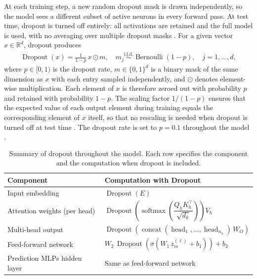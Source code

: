 At each training step, a new random dropout mask is drawn independently,
so the model sees a different subset of active neurons in every forward pass.
At test time, dropout is turned off entirely: all activations are retained
and the full model is used, with no averaging over multiple dropout masks
\citep{Dropout}. For a given vector $x \in \mathbb{R}^{d}$, dropout produces
\begin{align*}
    \operatorname{Dropout}(x) = \frac{1}{1 - p}\, x \odot m, \quad
    m_j \overset{\mathrm{i.i.d.}}{\sim} \operatorname{Bernoulli}(1 - p),
    \quad j = 1, \dots, d,
\end{align*}
where $p \in [0, 1)$ is the dropout rate, $m \in \{0, 1\}^{d}$ is a binary
mask of the same dimension as $x$ with each entry sampled independently,
and $\odot$ denotes element-wise multiplication. Each element of $x$ is
therefore zeroed out with probability $p$ and retained with probability
$1 - p$. The scaling factor $1/(1-p)$ ensures that the expected value of
each output element during training equals the corresponding element of $x$
itself, so that no rescaling is needed when dropout is turned off at test
time \citep{Srivastava2014dropout, PyTorchDropout}. The dropout rate is set
to $p = 0.1$ throughout the model \citep{AttentionIsAllYouNeed}.

\begin{table}[h]
    \centering
    \caption{Summary of dropout throughout the model. Each row specifies the component and the computation when dropout is included.}
    \label{tab:dropout_locations}
    \small
    \begin{tabular}{ll}
        \toprule
        \textbf{Component} & \textbf{Computation with Dropout} \\
        \midrule
        Input embedding & $\operatorname{Dropout}(E)$ \\
        \addlinespace
        Attention weights (per head) & $\operatorname{Dropout}\!\left(\operatorname{softmax}\!\left(\dfrac{Q_h K_h^\top}{\sqrt{d_k}}\right)\right) V_h$ \\
        \addlinespace
        Multi-head output & $\operatorname{Dropout}\!\left(\operatorname{concat}(\operatorname{head}_1, \dots, \operatorname{head}_{n_h})\, W_O\right)$ \\
        \addlinespace
        Feed-forward network & $W_2\, \operatorname{Dropout}\!\left(\sigma(W_1\, z^{(\ell)}_m + b_1)\right) + b_2$ \\
        \addlinespace
        Prediction MLPs hidden layer & Same as feed-forward network \\
        \bottomrule
    \end{tabular}
\end{table}

